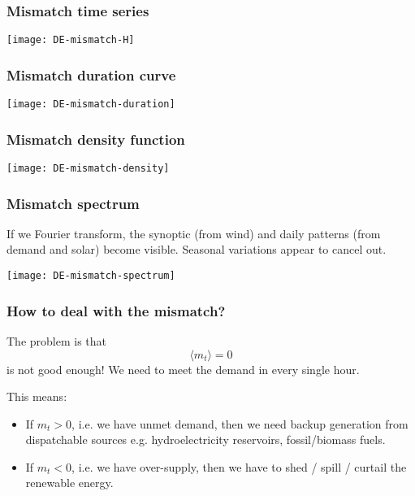 \documentclass[10pt,aspectratio=169,dvipsnames]{beamer}
\let\olditem\item
\renewcommand{\item}{%
\olditem\vspace{5pt}}
\begin{document}
\begin{frame}
  \frametitle{Mismatch time series}


  \centering
  \texttt{[image: DE-mismatch-H]}

\end{frame}



\begin{frame}
  \frametitle{Mismatch duration curve}



  \centering
  \texttt{[image: DE-mismatch-duration]}

\end{frame}




\begin{frame}
  \frametitle{Mismatch density function}

  \centering
  \texttt{[image: DE-mismatch-density]}

\end{frame}




\begin{frame}
  \frametitle{Mismatch spectrum}

  If we Fourier transform, the synoptic (from wind) and daily patterns (from demand and solar) become visible. Seasonal variations appear to cancel out.

  \centering
  \texttt{[image: DE-mismatch-spectrum]}

\end{frame}



\begin{frame}
  \frametitle{How to deal with the mismatch?}

  The problem is that
    \begin{equation*}
    \langle m_t \rangle = 0
  \end{equation*}
    is not good enough! We need to meet the demand in every single hour.

    This means:
    \begin{itemize}
      \item If $m_t > 0$, i.e. we have unmet demand, then we need
        backup generation from \alert{dispatchable} sources
        e.g. hydroelectricity reservoirs, fossil/biomass fuels.
      \item If $m_t < 0$, i.e. we have over-supply, then we have to
        shed / spill / \alert{curtail} the renewable energy.
    \end{itemize}


\end{frame}
\end{document}
